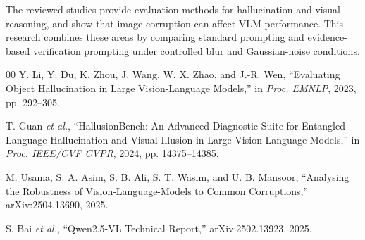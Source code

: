 \documentclass[conference]{IEEEtran}
\begin{document}
The reviewed studies provide evaluation methods for hallucination and visual reasoning, and show that image corruption can affect VLM performance. This research combines these areas by comparing standard prompting and evidence-based verification prompting under controlled blur and Gaussian-noise conditions.

\begin{thebibliography}{00}
Y. Li, Y. Du, K. Zhou, J. Wang, W. X. Zhao, and J.-R. Wen, ``Evaluating Object Hallucination in Large Vision-Language Models,'' in \emph{Proc. EMNLP}, 2023, pp. 292--305.

T. Guan \emph{et al.}, ``HallusionBench: An Advanced Diagnostic Suite for Entangled Language Hallucination and Visual Illusion in Large Vision-Language Models,'' in \emph{Proc. IEEE/CVF CVPR}, 2024, pp. 14375--14385.

M. Usama, S. A. Asim, S. B. Ali, S. T. Wasim, and U. B. Mansoor, ``Analysing the Robustness of Vision-Language-Models to Common Corruptions,'' arXiv:2504.13690, 2025.

S. Bai \emph{et al.}, ``Qwen2.5-VL Technical Report,'' arXiv:2502.13923, 2025.
\end{thebibliography}
\end{document}
